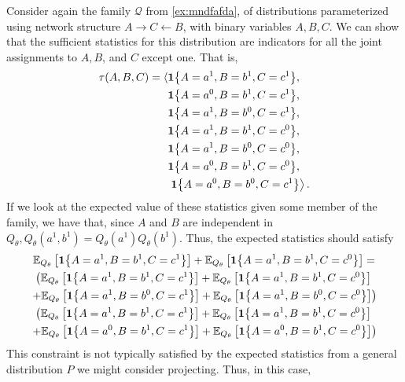 \documentclass{article}
\begin{document}
\begin{exma}
Consider again the family $\mathcal{Q}$ from \cref{ex:mndfafda}, of distributions parameterized using network structure $A \rightarrow C \leftarrow B$, with binary variables $A, B, C$. We can show that the sufficient statistics for this distribution are indicators for all the joint assignments to $A, B$, and $C$ except one. That is,
\begin{align*}
\begin{aligned}
\tau(A, B, C)=\langle& \indicate{A=a^{1}, B=b^{1}, C=c^{1}}, \\
& \indicate{A=a^{0}, B=b^{1}, C=c^{1}}, \\
& \indicate{A=a^{1}, B=b^{0}, C=c^{1}}, \\
& \indicate{A=a^{1}, B=b^{1}, C=c^{0}}, \\
& \indicate{A=a^{1}, B=b^{0}, C=c^{0}}, \\
& \indicate{A=a^{0}, B=b^{1}, C=c^{0}}, \\
&\left.\indicate{A=a^{0}, B=b^{0}, C=c^{1}}\right\rangle .
\end{aligned}
\end{align*}
If we look at the expected value of these statistics given some member of the family, we have that, since $A$ and $B$ are independent in $Q_{\theta}, Q_{\theta}\left(a^{1}, b^{1}\right)=Q_{\theta}\left(a^{1}\right) Q_{\theta}\left(b^{1}\right)$. Thus, the expected statistics should satisfy
\begin{align*}
\begin{gathered}
\mathbb{E}_{Q_{\theta}}\left[\indicate{A=a^{1}, B=b^{1}, C=c^{1}}\right]+\mathbb{E}_{Q_{\theta}}\left[\indicate{A=a^{1}, B=b^{1}, C=c^{0}}\right]= \\
\left(\mathbb{E}_{Q_{\theta}}\left[\indicate{A=a^{1}, B=b^{1}, C=c^{1}}\right]+\mathbb{E}_{Q_{\theta}}\left[\indicate{A=a^{1}, B=b^{1}, C=c^{0}}\right]\right. \\
\left.+\mathbb{E}_{Q_{\theta}}\left[\indicate{A=a^{1}, B=b^{0}, C=c^{1}}\right]+\mathbb{E}_{Q_{\theta}}\left[\indicate{A=a^{1}, B=b^{0}, C=c^{0}}\right]\right) \\
\left(\mathbb{E}_{Q_{\theta}}\left[\indicate{A=a^{1}, B=b^{1}, C=c^{1}}\right]+\mathbb{E}_{Q_{\theta}}\left[\indicate{A=a^{1}, B=b^{1}, C=c^{0}}\right]\right. \\
\left.+\mathbb{E}_{Q_{\theta}}\left[\indicate{A=a^{0}, B=b^{1}, C=c^{1}}\right]+\mathbb{E}_{Q_{\theta}}\left[\indicate{A=a^{0}, B=b^{1}, C=c^{0}}\right]\right)
\end{gathered}
\end{align*}
This constraint is not typically satisfied by the expected statistics from a general distribution $P$ we might consider projecting. Thus, in this case, 
\end{exma}
\end{document}
